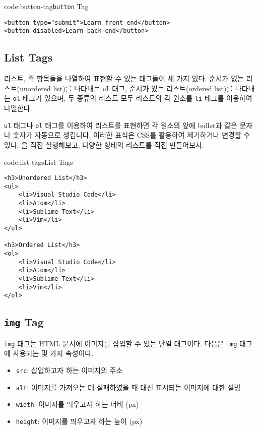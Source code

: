 \begin{codeenv}{code:button-tag}{\texttt{button} Tag}\begin{verbatim}
<button type="submit">Learn front-end</button>
<button disabled>Learn back-end</button>
\end{verbatim}
\end{codeenv}

\subsection*{List Tags}
리스트, 즉 항목들을 나열하여 표현할 수 있는 태그들이 세 가지 있다. 순서가 없는 리스트(unordered list)를 나타내는 \texttt{ul} 태그, 순서가 있는 리스트(ordered list)를 나타내는 \texttt{ol} 태그가 있으며, 두 종류의 리스트 모두 리스트의 각 원소를 \texttt{li} 태그를 이용하여 나열한다.

\texttt{ul} 태그나 \texttt{ol} 태그를 이용하여 리스트를 표현하면 각 원소의 앞에 bullet과 같은 문자나 숫자가 자동으로 생깁니다. 이러한 표식은 CSS를 활용하여 제거하거나 변경할 수 있다. 을 직접 실행해보고, 다양한 형태의 리스트를 직접 만들어보자.

\begin{codeenv}{code:list-tags}{List Tags}\begin{verbatim}
<h3>Unordered List</h3>
<ul>
    <li>Visual Studio Code</li>
    <li>Atom</li>
    <li>Sublime Text</li>
    <li>Vim</li>
</ul>

<h3>Ordered List</h3>
<ol>
    <li>Visual Studio Code</li>
    <li>Atom</li>
    <li>Sublime Text</li>
    <li>Vim</li>
</ol>
\end{verbatim}
\end{codeenv}

\subsection*{\texttt{img} Tag}
\texttt{img} 태그는 HTML 문서에 이미지를 삽입할 수 있는 단일 태그이다. 다음은 \texttt{img} 태그에 사용되는 몇 가지 속성이다.

\begin{itemize}
    \item \texttt{src}: 삽입하고자 하는 이미지의 주소
    \item \texttt{alt}: 이미지를 가져오는 데 실패하였을 때 대신 표시되는 이미지에 대한 설명
    \item \texttt{width}: 이미지를 띄우고자 하는 너비 (px)
    \item \texttt{height}: 이미지를 띄우고자 하는 높이 (px)
\end{itemize}

